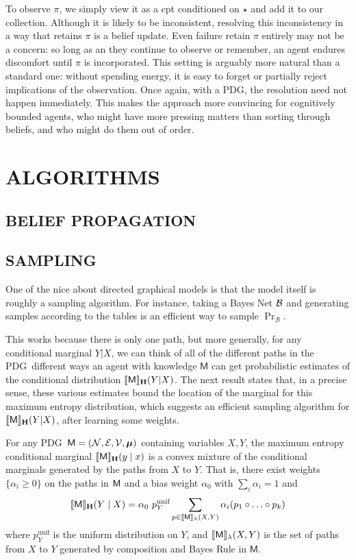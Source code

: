 \documentclass{article}
\newcommand\MaxEnt{_{\mathbf H}}
\newcommand{\sfM}{\mathsf M}
\newcommand{\MN}{PDG}
\numberwithin{equation}{section}
\begin{document}
\begin{notfocus}
	
	To observe $\pi$, we simply view it as a cpt conditioned on $\star$ and add it to our collection. 
	Although it is likely to be inconsistent, resolving this inconsistency in a way that retains $\pi$ is a belief update. 
	Even failure retain $\pi$ entirely may not be a concern: so long as an they continue to observe or remember, an agent endures discomfort until $\pi$ is incorporated. This setting is arguably more natural than a standard one: without spending energy, it is easy to forget or partially reject implications of the observation.	
	Once again, with a \MN, the resolution need not happen immediately. This makes the approach more convincing for cognitively bounded agents, who might have more pressing matters than sorting through beliefs, and who might do them out of order.

	\section{ALGORITHMS}\label{sec:algorithms}
	\subsection{BELIEF PROPAGATION}
	
	
	\subsection{SAMPLING}
	
	One of the nice about directed graphical models is that the model itself is roughly a sampling algorithm. For instance, taking a Bayes Net $\cal B$ and generating samples according to the tables is an efficient way to sample $\Pr_{\mathcal B}$.

	This works because there is only one path, but more generally, for any conditional marginal $Y|X$, we can think of all of the different paths in the \MN\ different ways an agent with knowledge $\sfM$ can get probabilistic estimates of the conditional distribution $\bbr{\sfM}\MaxEnt(Y | X)$. The next result states that, in a precise sense, these various estimates bound the location of the marginal for this maximum entropy distribution, which suggests an efficient sampling algorithm for $\bbr{\sfM}\MaxEnt(Y | X)$, after learning some weights.
	
	\begin{conj}\label{thm:maxent-hull}
		For any \MN\ $\sfM = \mnvars[]$ containing variables $X, Y$, the maximum entropy conditional marginal $\bbr{\sfM}\MaxEnt(y \mid x)$ is a convex mixture of the conditional marginals generated by the paths from $X$ to $Y$.  That is, there exist weights $\{\alpha_i \geq 0\}$ on the paths in $\sf M$ and a bias weight $\alpha_0$ with $\sum_i {\alpha_i} = 1$ and
		$$ \bbr{\sfM}\MaxEnt(Y \mid X) = \alpha_0 \  p^{\text{unif}}_Y \sum_{p \in \bbr{\sfM}_\lambda(X, Y)} \alpha_i (p_1 \circ \ldots \circ p_k) $$		
		where $p^{\text{unif}}_Y$ is the uniform distribution on $Y$, and $\bbr{\sfM}_\lambda(X,Y)$ is the set of paths from $X$ to $Y$ generated by composition and Bayes Rule in $\sfM$. 
	\end{conj}


\end{notfocus}
\end{document}
